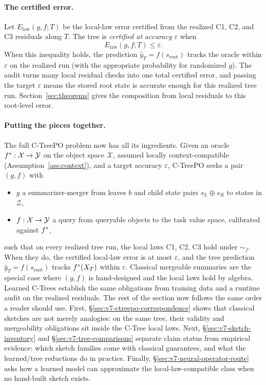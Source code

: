 \paragraph{The certified error.}
Let \(E_{\mathrm{law}}(g,f;T)\) be the local-law error certified from
the realized C1, C2, and C3 residuals along \(T\). The tree is
\emph{certified at accuracy \(\varepsilon\)} when
\[
  E_{\mathrm{law}}(g,f;T)\le\varepsilon .
\]
When this inequality holds, the prediction
\(\widehat y_T=f(s_{\mathrm{root}})\) tracks the oracle within
\(\varepsilon\) on the realized run (with the appropriate probability
for randomized \(g\)). The audit turns many local residual checks
into one total certified error, and passing the target
\(\varepsilon\) means the stored root state is accurate enough for
this realized tree run. Section~\ref{sec:theorems} gives the
composition from local residuals to this root-level error.

\paragraph{Putting the pieces together.}
The full C-TreePO problem now has all its ingredients. Given an oracle
\(f^\ast:\mathcal{X}\to\mathcal{Y}\) on the object space \(\mathcal{X}\),
assumed locally context-compatible (Assumption~\ref{ass:context}), and a
target accuracy \(\varepsilon\), C-TreePO seeks a pair \((g,f)\) with
\begin{itemize}[leftmargin=1.5em,nosep]
\item \(g\) a summarizer-merger from leaves \(b\) and child state pairs
\(s_L\oplus s_R\) to states in \(\mathcal{Z}\),
\item \(f:\mathcal X\to\mathcal{Y}\) a query from queryable objects to the task
value space, calibrated
against \(f^\ast\),
\end{itemize}
such that on every realized tree run, the local laws C1, C2, C3 hold
under \(\sim_f\). When they do, the certified local-law error is at
most \(\varepsilon\), and the tree prediction
\(\widehat y_T = f(s_{\mathrm{root}})\) tracks \(f^\ast(X_T)\) within
\(\varepsilon\). Classical mergeable summaries are the special case
where \((g,f)\) is hand-designed and the local laws hold by algebra.
Learned C-Trees establish the same obligations from training data and
a runtime audit on the realized residuals. The rest of the section now
follows the same order a reader should use. First,
\S\ref{sec:v7-ctreepo-correspondence} shows that classical sketches
are not merely analogies: on the same tree, their validity and
mergeability obligations sit inside the C-Tree local laws. Next,
\S\ref{sec:v7-sketch-inventory} and
\S\ref{sec:v7-tree-comparisons} separate claim status from empirical
evidence: which sketch families come with classical guarantees, and
what the learned/tree reductions do in practice. Finally,
\S\ref{sec:v7-neural-operator-route} asks how a learned model can
approximate the local-law-compatible class when no hand-built sketch
exists.

